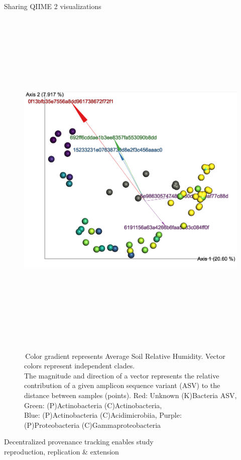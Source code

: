 \documentclass[final]{beamer}
\newlength{\colwidth}
\begin{document}
\begin{frame}[t]
\begin{columns}[t]
\begin{column}{\colwidth}
\begin{block}{Sharing QIIME 2 visualizations}
    \begin{figure}[tph!]
      {\includegraphics[height=17cm]{assets/emperor}}
      \caption{\,Color gradient represents Average Soil Relative Humidity. Vector colors represent independent clades. \\The magnitude and direction of a vector represents the relative contribution of a given amplicon sequence variant (ASV) to the distance between samples (points). Red: Unknown (K)Bacteria ASV, Green: (P)Actinobacteria (C)Actinobacteria, \\Blue: (P)Actinobacteria (C)Acidimicrobiia, Purple: (P)Proteobacteria (C)Gammaproteobacteria}
      \label{fig:emperor}
    \end{figure}

  \end{block}

  \begin{block}{Decentralized provenance tracking enables study \\ reproduction, replication \& extension}


\end{block}
\end{column}
\end{columns}
\end{frame}
\end{document}
